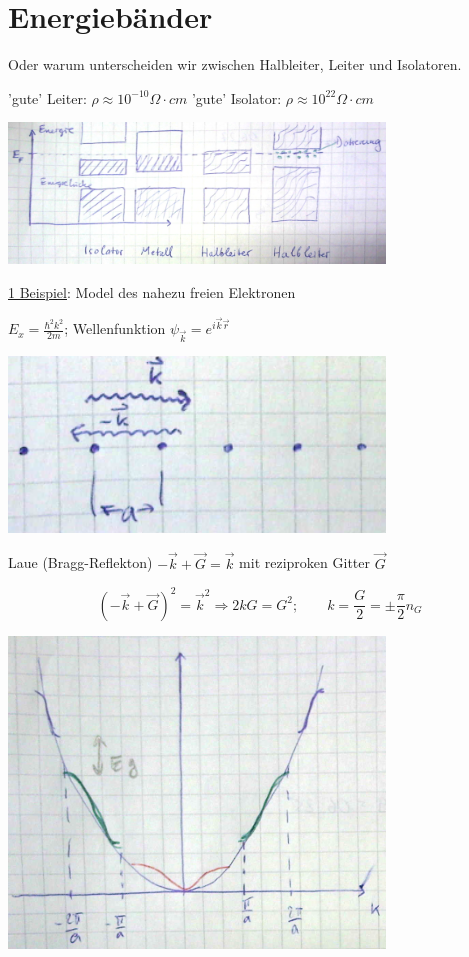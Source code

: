 


\setcounter{chapter}{8}
\chapter{Energiebänder}


Oder warum unterscheiden wir zwischen Halbleiter, Leiter und Isolatoren.

'gute' Leiter: \(\rho\approx 10^{-10}\Omega \cdot cm\)
'gute' Isolator:  \(\rho\approx 10^{22}\Omega \cdot cm\)

\includegraphics[width=0.75\textwidth]{kap06_31.png}

\underline{1 Beispiel}: Model des nahezu freien Elektronen

\(E_x=\frac{\hbar^2k^2}{2m}\); Wellenfunktion \(\psi_{\vec k} = e^{i\vec k\vec r}\)

\includegraphics[width=0.75\textwidth]{kap06_32.png}

Laue (Bragg-Reflekton) \(-\vec k+\vec G = \vec k\) mit reziproken Gitter \(\vec G\)

\[ (-\vec k +\vec G)^2 = \vec k^2 \Rightarrow 2kG = G^2; \qquad k=\frac{G}{2}=\pm \frac{\pi}{2}n_G\]

\includegraphics[width=0.75\textwidth]{kap06_33.png}

